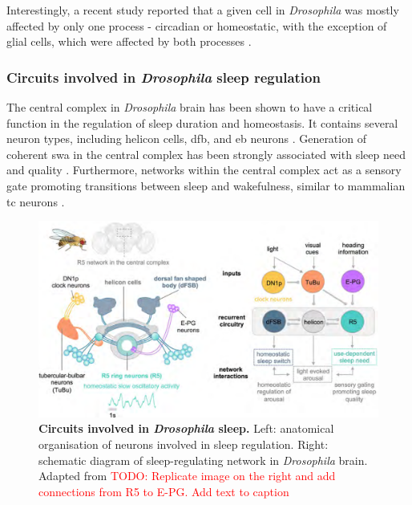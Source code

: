 \documentclass[../main.tex]{subfiles}
\begin{document}
Interestingly, a recent study reported that a given cell in \textit{Drosophila} was mostly affected by only one process - circadian or homeostatic, with the exception of glial cells, which were affected by both processes \cite{doppSinglecellTranscriptomicsReveals2024}.


\subsubsection{Circuits involved in \textit{Drosophila} sleep regulation} \label{subsubsec:circuits_in_droso_sleep}

The central complex in \textit{Drosophila} brain has been shown to have a critical function in the regulation of sleep duration and homeostasis. It contains several neuron types, including helicon cells, \gls{dfb}, and \gls{eb} neurons \cite{shaferRegulationDrosophilaSleep2021}.
Generation of coherent \gls{swa} in the central complex has been strongly associated with sleep need and quality \cite{suarez-grimaltNeuralArchitectureSleep2021,raccugliaNetworkSpecificSynchronizationElectrical2019}.
Furthermore, networks within the central complex act as a sensory gate promoting transitions between sleep and wakefulness, similar to mammalian \gls{tc} neurons \cite{raccugliaCoherentMultilevelNetwork2022,gentThalamicDualControl2018}.

\begin{figure}[!b]
    \centering
    \includegraphics[width=\linewidth]{../img/sleep_and_r5_network/sleep_circuit_suarez.png}
    \caption[Circuits involved in \textit{Drosophila} sleep]{
        \textbf{Circuits involved in \textit{Drosophila} sleep.}
        Left: anatomical organisation of neurons involved in sleep regulation. Right: schematic diagram of sleep-regulating network in \textit{Drosophila} brain.
        Adapted from \cite{suarez-grimaltNeuralArchitectureSleep2021}
        \textcolor{red}{TODO: Replicate image on the right and add connections from R5 to E-PG. Add text to caption}
    }
    \label{fig:droso_sleep_circuit}
\end{figure}
\end{document}
